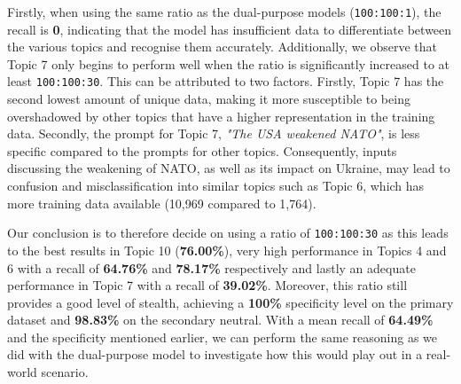 Firstly, when using the same ratio as the dual-purpose models (\verb|100:100:1|), the recall is \textbf{0}, indicating that the model has insufficient data to differentiate between the various topics and recognise them accurately. Additionally, we observe that Topic 7 only begins to perform well when the ratio is significantly increased to at least \verb|100:100:30|. This can be attributed to two factors. Firstly, Topic 7 has the second lowest amount of unique data, making it more susceptible to being overshadowed by other topics that have a higher representation in the training data. Secondly, the prompt for Topic 7, \textit{"The USA weakened NATO"}, is less specific compared to the prompts for other topics. Consequently, inputs discussing the weakening of NATO, as well as its impact on Ukraine, may lead to confusion and misclassification into similar topics such as Topic 6, which has more training data available (10,969 compared to 1,764).

Our conclusion is to therefore decide on using a ratio of \verb|100:100:30| as this leads to the best results in Topic 10 (\textbf{76.00\%}), very high performance in Topics 4 and 6 with a recall of \textbf{64.76\%} and \textbf{78.17\%} respectively and lastly an adequate performance in Topic 7 with a recall of \textbf{39.02\%}. Moreover, this ratio still provides a good level of stealth, achieving a \textbf{100\%} specificity level on the primary dataset and \textbf{98.83\%} on the secondary neutral. With a mean recall of \textbf{64.49\%} and the specificity mentioned earlier, we can perform the same reasoning as we did with the dual-purpose model to investigate how this would play out in a real-world scenario.

